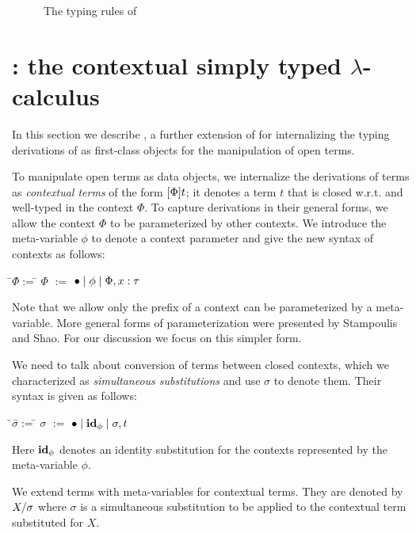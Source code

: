 \documentclass[10pt]{article}
\begin{document}
\begin{figure}[ht!]
\caption{The typing rules of \STLCD}
\label{fig:stlcd-typing-rules}
\end{figure}



\section{\STLCC: the contextual simply typed $\lambda$-calculus}
%
In this section we describe \STLCC, a further extension of \STLCE for
internalizing the typing derivations of \STLCE as first-class objects
for the manipulation of open \STLCE terms.

To manipulate open \STLCE terms as data objects, we
internalize the derivations of \STLCE terms as \emph{contextual terms}
of the form $[{\Phi}]{t}$; it denotes a term $t$ that is closed
w.r.t. and well-typed in the context $\Phi$.
%
To capture derivations in their general forms, we allow the context
$\Phi$ to be parameterized by other contexts. We introduce the
meta-variable $\phi$ to denote a context parameter and give the new
syntax of contexts as follows:
%
\begin{tabbing}
\qquad\=$\Phi$\quad\=$:=$\quad\=\kill
\>$\Phi$  \>$:=$ \>$\bullet \; | \; \phi \; | \; \Phi, x:\tau$
\end{tabbing}
%
Note that we allow only the prefix of a context can be parameterized
by a meta-variable. More general forms of parameterization were
presented by Stampoulis and Shao\cite{stampoulis12}. For our
discussion we focus on this simpler form.

We need to talk about conversion of terms between closed contexts,
which we characterized as \emph{simultaneous substitutions} and use
$\sigma$ to denote them. Their syntax is given as follows:
%
\begin{tabbing}
\qquad\=$\sigma$\quad\=$:=$\quad\=\kill
\>$\sigma$  \>$:=$ \>$\bullet \; | \; {\bf id}_{\phi} \; | \; \sigma, t$
\end{tabbing}
%
Here ${\bf id}_{\phi}$ denotes an identity substitution for the contexts
represented by the meta-variable $\phi$.

We extend \STLCE terms with meta-variables for contextual terms. They
are denoted by $X / \sigma$ where $\sigma$ is a simultaneous
substitution to be applied to the contextual term substituted for $X$.
\end{document}
